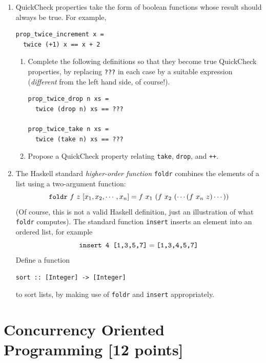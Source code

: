 \documentclass{article}
\begin{document}
\begin{enumerate}
\item
QuickCheck properties take the form of boolean functions whose result
should always be true. For example,
\begin{verbatim}
prop_twice_increment x =
  twice (+1) x == x + 2
\end{verbatim}
\begin{enumerate}
\item
Complete the following definitions so that they become true QuickCheck
properties, by replacing \verb!???! in each case by a suitable
expression ({\em different} from the left hand side, of course!).
\begin{verbatim}
prop_twice_drop n xs =
  twice (drop n) xs == ???

prop_twice_take n xs =
  twice (take n) xs == ???
\end{verbatim}
\item
Propose a QuickCheck property relating \verb!take!, \verb!drop!, and \verb!++!.
\end{enumerate}

\item
The Haskell standard {\em higher-order function} \verb!foldr! combines
the elements of a list using a two-argument function:
\[ \verb!foldr!~f~z~[x_1,x_2,\cdots,x_n] =
f~x_1~(f~x_2~(\cdots(f~x_n~z)\cdots)) \]
(Of course, this is not a valid Haskell definition, just an
illustration of what \verb!foldr! computes).
The standard function \verb!insert! inserts an element into an ordered
list, for example
\[ \verb!insert 4 [1,3,5,7]! = \verb![1,3,4,5,7]! \]
Define a function
\begin{verbatim}
sort :: [Integer] -> [Integer]
\end{verbatim}
to sort lists, by making use of \verb!foldr! and \verb!insert!
appropriately.

\end{enumerate}

\newpage
\section{Concurrency Oriented Programming [12 points]}
\end{document}
